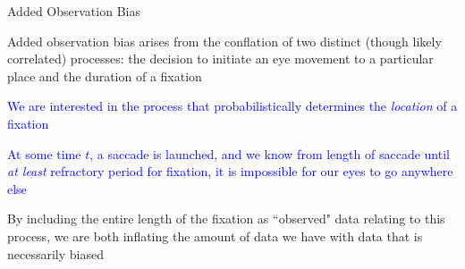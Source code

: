 \documentclass{beamer}
\newcommand{\vp}{\vspace{2mm}}
\providecommand{\cn}[1]{\textcolor{blue}{#1}}
\begin{document}
%
%
%
%
%


\begin{frame}{Added Observation Bias}


Added observation bias arises from the conflation of two distinct (though likely correlated) processes: the decision to initiate an eye movement to a particular place and the duration of a fixation\vp

\cn{We are interested in the process that probabilistically determines the \textit{location} of a fixation} \vp

\cn{At some time $t$, a saccade is launched, and we know from length of saccade until \textit{at least} refractory period for fixation, it is impossible for our eyes to go anywhere else} \vp

By including the entire length of the fixation as ``observed" data relating to this process, we are both inflating the amount of data we have with data that is necessarily biased
\end{frame}
\end{document}
